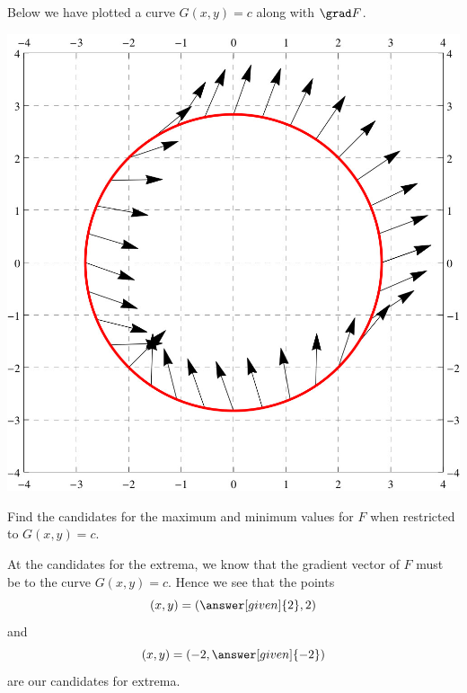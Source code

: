 \documentclass{ximera}
\begin{document}
\begin{example}
  Below we have plotted a curve $G(x,y) = c$ along with $\grad F$.
  \begin{image}
    \includegraphics{curveVectors1.jpg}
  \end{image}
  Find the candidates for the maximum and minimum values for $F$ when
  restricted to $G(x,y) = c$.
  \begin{explanation}
    At the candidates for the extrema, we know that the gradient
    vector of $F$ must be
     to
    the curve $G(x,y) = c$. Hence we
    see that the points
    \[
    (x,y) = (\answer[given]{2},2)
    \]
    and
    \[
    (x,y) = (-2,\answer[given]{-2})
    \]
    are our candidates for extrema.
  \end{explanation}
\end{example}
\end{document}
